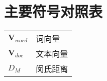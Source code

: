 
\chapter{主要符号对照表}
\label{chap:symb}
\begin{tabular}{ll}

\hspace{2em}$\mathbf{V}_{word}$       & \hspace{5em}词向量 \\
\hspace{2em}$\mathbf{V}_{doc}$       & \hspace{5em}文本向量 \\
\hspace{2em}$D_{M}$       & \hspace{5em}闵氏距离 \\




\end{tabular}
